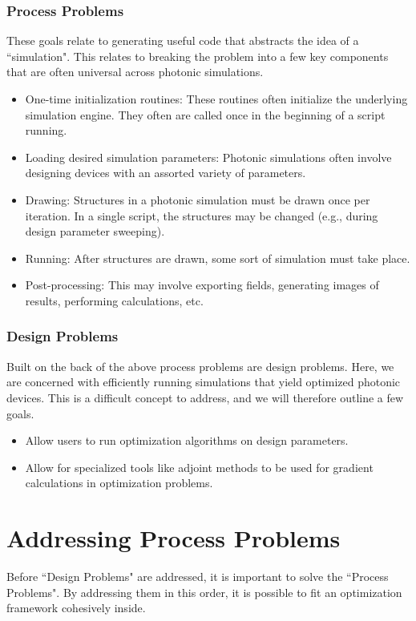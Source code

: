 \documentclass[12pt]{article}
\begin{document}
\subsubsection{Process Problems}
These goals relate to generating useful code that abstracts the idea of a ``simulation". This relates to breaking the problem into a few key components that are often universal across photonic simulations.
\begin{itemize}
\item One-time initialization routines: These routines often initialize the underlying simulation engine. They often are called once in the beginning of a script running. 
\item Loading desired simulation parameters: Photonic simulations often involve designing devices with an assorted variety of parameters. 
\item Drawing: Structures in a photonic simulation must be drawn once per iteration. In a single script, the structures may be changed (e.g., during design parameter sweeping).
\item Running: After structures are drawn, some sort of simulation must take place.
\item Post-processing: This may involve exporting fields, generating images of results, performing calculations, etc.
\end{itemize}

\subsubsection{Design Problems}
Built on the back of the above process problems are design problems. Here, we are concerned with efficiently running simulations that yield optimized photonic devices. This is a difficult concept to address, and we will therefore outline a few goals.
\begin{itemize}
\item Allow users to run optimization algorithms on design parameters.
\item Allow for specialized tools like adjoint methods to be used for gradient calculations in optimization problems.
\end{itemize}

\section{Addressing Process Problems}
Before ``Design Problems" are addressed, it is important to solve the ``Process Problems". By addressing them in this order, it is possible to fit an optimization framework cohesively inside.
\end{document}
